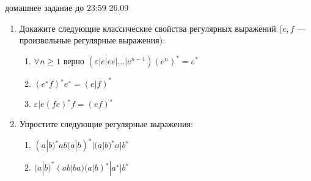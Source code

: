 \documentclass[12pt]{article}
\begin{document}

{\Large домашнее задание до 23:59 26.09}
\bigskip

\begin{enumerate}
  \item
  { Докажите следующие классические свойства регулярных выражений ($e, f$ --- произвольные регулярные выражения): 
    \begin{enumerate}
      \item { $  \forall n \geq 1 $ верно $ (\varepsilon | e | ee | \dots | e^{n−1})(e^{n})^{*} = e^{*} $ }
      \item { $ (e^{∗} f)^{∗} e^{∗} = (e | f)^{*} $ }
      \item { $ \varepsilon | e (fe)^{∗} f = (ef)^{∗} $ }
    \end{enumerate}
  }
  
  \item 
  { Упростите следующие регулярные выражения: 
    \begin{enumerate} 
      \item { $ (a | b)^{∗} ab (a | b)^{∗} | (a | b)^{∗} a | b^{∗} $ }
      \item { $ (a | b)^{*} (ab | ba) (a | b)^{∗} | a^{∗} | b^{∗} $ }
    \end{enumerate}
  }
  

\end{enumerate}
\end{document}
